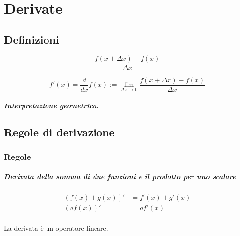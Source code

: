 \chapter{Derivate}\label{ch:derivatives}

\section{Definizioni}
\begin{definition}
\begin{equation}
    \dfrac{f(x+\Delta x) - f(x)}{\Delta x}
\end{equation}
\end{definition}

\begin{definition}[Derivata]
\begin{equation}
  f'(x) = \dfrac{d }{dx} f(x) := \lim_{\Delta x \rightarrow 0} \dfrac{f(x+\Delta x) - f(x)}{\Delta x}
\end{equation}
\end{definition}

\begin{definition}
\end{definition}

\paragraph{Interpretazione geometrica.}

\section{Regole di derivazione}
\subsection{Regole}
\paragraph{Derivata della somma di due funzioni e il prodotto per uno scalare}
\begin{equation}
\begin{aligned}
    (f(x) + g(x))' & = f'(x) + g'(x) \\
    (a f(x))' & = a f'(x) \\
\end{aligned}
\end{equation}
\begin{property} La derivata è un operatore lineare.
\end{property}

